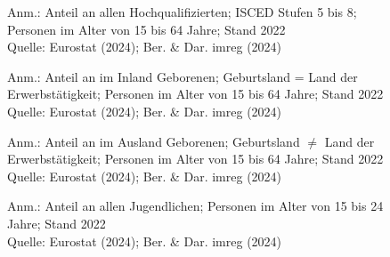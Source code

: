 \begin{figure}[p]
	{\centering {}}
	\label{map:erwerbhoch}
	\begin{spacing}{1} \scriptsize
		Anm.: Anteil an allen Hochqualifizierten; ISCED Stufen 5 bis 8; Personen im Alter von 15 bis 64 Jahre; Stand 2022\\
		Quelle: Eurostat (2024); Ber. \& Dar. imreg (2024) \end{spacing}
\end{figure}


\begin{figure}[p]
	{\centering {}}
	\label{map:erwerbinland}
	\begin{spacing}{1} \scriptsize
		Anm.: Anteil an im Inland Geborenen; Geburtsland = Land der Erwerbstätigkeit; Personen im Alter von 15 bis 64 Jahre; Stand 2022\\
		Quelle: Eurostat (2024); Ber. \& Dar. imreg (2024) \end{spacing}
\end{figure}


\begin{figure}[p]
	{\centering {}}
	\label{map:erwerbausland}
	\begin{spacing}{1} \scriptsize
		Anm.: Anteil an im Ausland Geborenen; Geburtsland $\neq$ Land der Erwerbstätigkeit; Personen im Alter von 15 bis 64 Jahre; Stand 2022\\
		Quelle: Eurostat (2024); Ber. \& Dar. imreg (2024) \end{spacing}
\end{figure}


\begin{figure}[p]
	{\centering {}}
	\label{map:erwerbjugend}
	\begin{spacing}{1} \scriptsize
		Anm.: Anteil an allen Jugendlichen; Personen im Alter von 15 bis 24 Jahre; Stand 2022\\
		Quelle: Eurostat (2024); Ber. \& Dar. imreg (2024) \end{spacing}
\end{figure}


